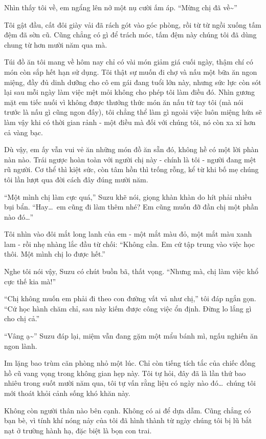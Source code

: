 \documentclass[../main.tex]{subfiles}
\begin{document}
Nhìn thấy tôi về, em ngẩng lên nở một nụ cười ấm áp. ``Mừng chị đã về\~{}''

Tôi gật đầu, cất đôi giày vải đã rách gót vào góc phòng, rồi từ từ ngồi xuống tấm đệm đã sờn cũ. Cũng chẳng có gì để trách móc, tấm đệm này chúng tôi đã dùng chung từ hơn mười năm qua mà.

Túi đồ ăn tôi mang về hôm nay chỉ có vài món giảm giá cuối ngày, thậm chí có món còn sắp hết hạn sử dụng. Tôi thật sự muốn đi chợ và nấu một bữa ăn ngon miệng, đầy đủ dinh dưỡng cho cô em gái đang tuổi lớn này, nhưng sức lực còn sót lại sau mỗi ngày làm việc mệt mỏi không cho phép tôi làm điều đó. Nhìn gương mặt em tiếc nuối vì không được thưởng thức món ăn nấu từ tay tôi (mà nói trước là nấu gì cũng ngon đấy), tôi chẳng thể làm gì ngoài việc luôn miệng hứa sẽ làm vậy khi có thời gian rảnh - một điều mà đối với chúng tôi, nó còn xa xỉ hơn cả vàng bạc.

Dù vậy, em ấy vẫn vui vẻ ăn những món đồ ăn sẵn đó, không hề có một lời phàn nàn nào. Trái ngược hoàn toàn với người chị này - chính là tôi - người đang mệt rũ người. Cơ thể thì kiệt sức, còn tâm hồn thì trống rỗng, kể từ khi bố mẹ chúng tôi lần lượt qua đời cách đây đúng mười năm.

``Một mình chị làm cực quá,'' Suzu khẽ nói, giọng khàn khàn do hít phải nhiều bụi bẩn. ``Hay\dots\ em cũng đi làm thêm nhé? Em cũng muốn đỡ đần chị một phần nào đó\dots''

Tôi nhìn vào đôi mắt long lanh của em - một mắt màu đỏ, một mắt màu xanh lam - rồi nhẹ nhàng lắc đầu từ chối: ``Không cần. Em cứ tập trung vào việc học thôi. Một mình chị lo được hết.''

Nghe tôi nói vậy, Suzu có chút buồn bã, thất vọng. ``Nhưng mà, chị làm việc khổ cực thế kia mà!''

``Chị không muốn em phải đi theo con đường vất vả như chị,'' tôi đáp ngắn gọn. ``Cứ học hành chăm chỉ, sau này kiếm được công việc ổn định. Đừng lo lắng gì cho chị cả.''

``Vâng ạ\~{}'' Suzu đáp lại, miệm vẫn đang gặm một mẩu bánh mì, ngấu nghiến ăn ngon lành.

Im lặng bao trùm căn phòng nhỏ một lúc. Chỉ còn tiếng tích tắc của chiếc đồng hồ cũ vang vọng trong không gian hẹp này. Tôi tự hỏi, đây đã là lần thứ bao nhiêu trong suốt mười năm qua, tôi tự vấn rằng liệu có ngày nào đó\dots\ chúng tôi mới thoát khỏi cảnh sống khó khăn này.

Không còn người thân nào bên cạnh. Không có ai để dựa dẫm. Cũng chẳng có bạn bè, vì tính khí nóng nảy của tôi đã hình thành từ ngày chúng tôi bị lũ bắt nạt ở trường hành hạ, đặc biệt là bọn con trai.
\end{document}

